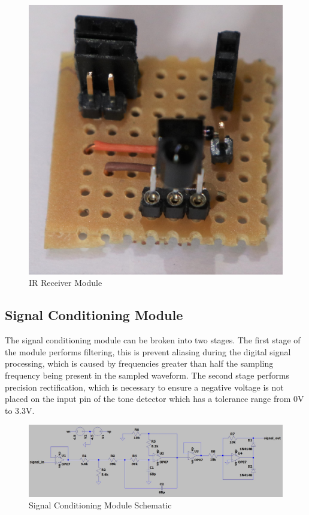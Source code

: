\begin{figure}[H]
	\centering
	\includegraphics[width=.6\textwidth]{figures/modules/ir_receiver.jpg}
	\caption{IR Receiver Module}
	\label{fig:module_ir_receiver}
\end{figure}






\subsection{Signal Conditioning Module}

The signal conditioning module can be broken into two stages. The first stage of the module performs filtering, this is prevent aliasing during the digital signal processing, which is caused by frequencies greater than half the sampling frequency being present in the sampled waveform. The second stage performs precision rectification, which is necessary to ensure a negative voltage is not placed on the input pin of the tone detector which has a tolerance range from 0V to 3.3V.

\begin{figure}[H]
	\centering
	\includegraphics[width=\textwidth]{figures/design/filter_and_rectify}
	\caption{Signal Conditioning Module Schematic}
	\label{fig:schematic_filter_and_rectify}
\end{figure}

